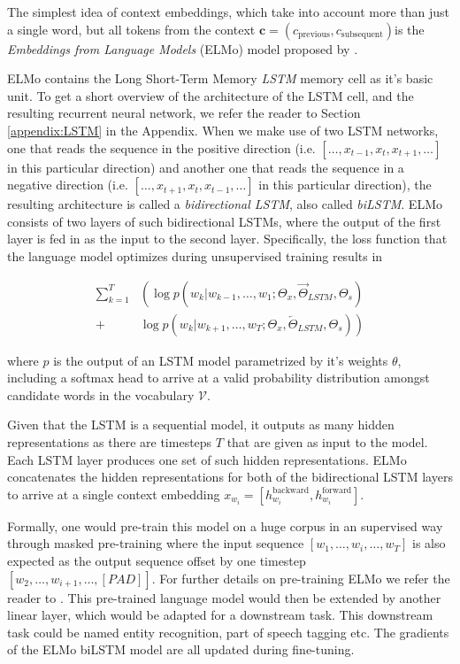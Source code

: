 \documentclass[a4paper,12pt,twoside,openright]{report}
\begin{document}
The simplest idea of context embeddings, which take into account more than just a single word, but all tokens from the context $\mathbf{c} = (c_\text{previous}, c_\text{subsequent}) $is the \textit{Embeddings from Language Models} (ELMo) model proposed by \cite{peters17b}.

ELMo contains the Long Short-Term Memory \textit{LSTM} memory cell as it's basic unit.
To get a short overview of the architecture of the LSTM cell, and the resulting recurrent neural network, we refer the reader to Section \ref{appendix:LSTM} in the Appendix.
When we make use of two LSTM networks, one that reads the sequence in the positive direction (i.e. $[\ldots, x_{t-1}, x_t, x_{t+1}, \ldots]$ in this particular direction) and another one that reads the sequence in a negative direction (i.e. $[\ldots, x_{t+1}, x_t, x_{t-1}, \ldots]$ in this particular direction), the resulting architecture is called a \textit{bidirectional LSTM}, also called \textit{biLSTM}.
ELMo consists of two layers of such bidirectional LSTMs, where the output of the first layer is fed in as the input to the second layer.
Specifically, the loss function that the language model optimizes during unsupervised training results in 

\begin{align} 
\sum_{k=1}^{T} &\left(\log p\left(w_{k} | w_{k-1}, \ldots, w_{1} ; \Theta_{x}, \vec{\Theta}_{L S T M}, \Theta_{s}\right)\right.\\
+&\left.\log p\left(w_{k} | w_{k+1}, \ldots, w_{T}; \Theta_{x}, \overleftarrow{\Theta}_{L S T M}, \Theta_{s}\right)\right) 
\end{align}

where $p$ is the output of an LSTM model parametrized by it's weights $\theta$, including a softmax head to arrive at a valid probability distribution amongst candidate words in the vocabulary $\mathcal{V}$.

Given that the LSTM is a sequential model, it outputs as many hidden representations as there are timesteps $T$ that are given as input to the model. 
Each LSTM layer produces one set of such hidden representations.
ELMo concatenates the hidden representations for both of the bidirectional LSTM layers to arrive at a single context embedding $x_{w_i} = [h^\text{backward}_{w_i}, h^\text{forward}_{w_i}]$.


Formally, one would pre-train this model on a huge corpus in an supervised way through masked pre-training where the input sequence $[w_1, \ldots , w_i, \ldots, w_T]$ is also expected as the output sequence offset by one timestep $[w_2, \ldots, w_{i+1}, \ldots , [PAD] ]$.
For further details on pre-training ELMo we refer the reader to \cite{jozefowicz16}.
This pre-trained language model would then be extended by another linear layer, which would be adapted for a downstream task.
This downstream task could be named entity recognition, part of speech tagging etc.
The gradients of the ELMo biLSTM model are all updated during fine-tuning. 
\end{document}

